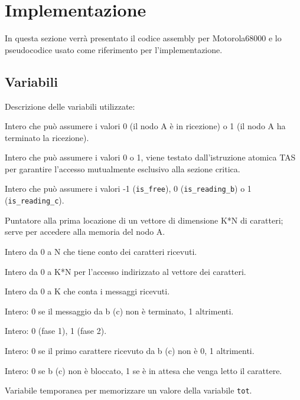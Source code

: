 \documentclass{article}
\begin{document}

\section{Implementazione}
In questa sezione verrà presentato il codice assembly per Motorola68000 e lo pseudocodice usato come riferimento per l'implementazione.

\subsection{Variabili}
Descrizione delle variabili utilizzate: 
\\

\begin{description}[style=nextline,leftmargin=3.45cm,labelwidth=2.8cm,labelsep=0.6cm,font=\ttfamily\bfseries]
  \item[fine] Intero che può assumere i valori 0 (il nodo A è in ricezione) o 1 (il nodo A ha terminato la ricezione).
  \item[lock] Intero che può assumere i valori 0 o 1, viene testato dall'istruzione atomica TAS per garantire l'accesso mutualmente esclusivo alla sezione critica.
  \item[possesso] Intero che può assumere i valori -1 (\texttt{is\_free}), 0 (\texttt{is\_reading\_b}) o 1 (\texttt{is\_reading\_c}).
  \item[buff] Puntatore alla prima locazione di un vettore di dimensione K*N di caratteri; serve per accedere alla memoria del nodo A.
  \item[curr] Intero da 0 a N che tiene conto dei caratteri ricevuti.
  \item[tot] Intero da 0 a K*N per l’accesso indirizzato al vettore dei caratteri.
  \item[msg] Intero da 0 a K che conta i messaggi ricevuti.
  \item[end\_b,(end\_c)] Intero: 0 se il messaggio da b (c) non è terminato, 1 altrimenti.
  \item[fase2] Intero: 0 (fase 1), 1 (fase 2).
  \item[cond\_b,(cond\_c)] Intero: 0 se il primo carattere ricevuto da b (c) non è 0, 1 altrimenti.
  \item[b\_sus,(c\_sus)] Intero: 0 se b (c) non è bloccato, 1 se è in attesa che venga letto il carattere.
  \item[idx] Variabile temporanea per memorizzare un valore della variabile \texttt{tot}.
\end{description}
\newpage
\end{document}
